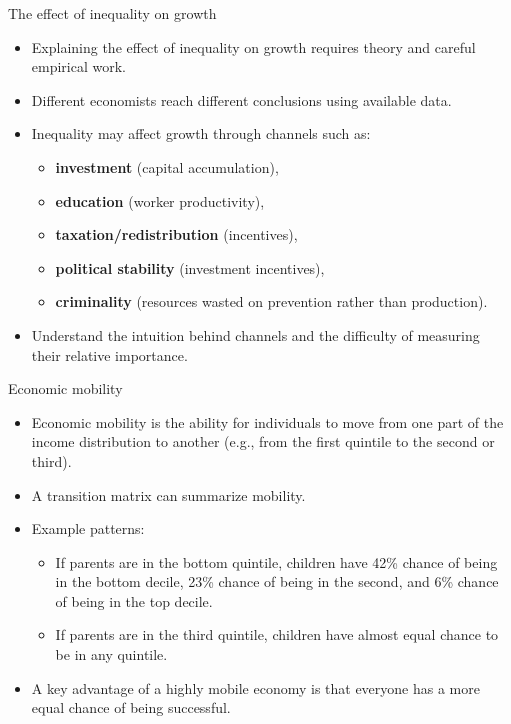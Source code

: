 \documentclass[aspectratio=169]{beamer}
\begin{document}
\begin{frame}{The effect of inequality on growth}
\transfade
\begin{itemize}
\item Explaining the effect of inequality on growth requires theory and careful empirical work.
\item Different economists reach different conclusions using available data.
\item Inequality may affect growth through channels such as:
\begin{itemize}
\item \textbf{investment} (capital accumulation),
\item \textbf{education} (worker productivity),
\item \textbf{taxation/redistribution} (incentives),
\item \textbf{political stability} (investment incentives),
\item \textbf{criminality} (resources wasted on prevention rather than production).
\end{itemize}
\item Understand the intuition behind channels and the difficulty of measuring their relative importance.
\end{itemize}
\end{frame}

\begin{frame}{Economic mobility}
\transfade
\begin{itemize}
\item Economic mobility is the ability for individuals to move from one part of the income distribution to another (e.g., from the first quintile to the second or third).
\item A transition matrix can summarize mobility.
\item Example patterns:
\begin{itemize}
\item If parents are in the bottom quintile, children have 42\% chance of being in the bottom decile, 23\% chance of being in the second, and 6\% chance of being in the top decile.
\item If parents are in the third quintile, children have almost equal chance to be in any quintile.
\end{itemize}
\item A key advantage of a highly mobile economy is that everyone has a more equal chance of being successful.
\end{itemize}
\end{frame}
\end{document}
